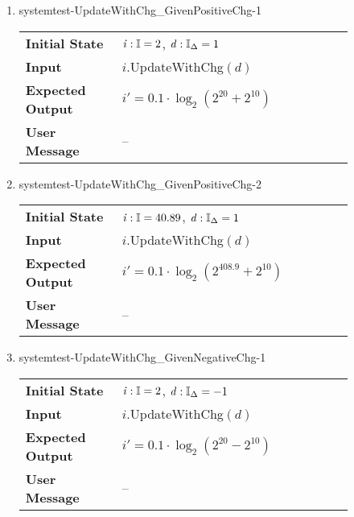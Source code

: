 \begin{enumerate}

    \item{systemtest-UpdateWithChg\_GivenPositiveChg-1}
    \begin{table}[H]
        \centering
        \begin{tabular}{P{0.25\linewidth}P{0.6\linewidth}}
            \toprule
            \textbf{Initial State} & $ \mathit{i} : \mathbb{I} = 2
            $, $ \mathit{d} : \mathbb{I}_{\Delta} = 1 $ \\
            \textbf{Input} & $\mathit{i}.
            $UpdateWithChg$(\mathit{d}) $ \\ \midrule
            \textbf{Expected Output} & $ \mathit{i}' = 0.1 \cdot \log_2(2^{20}
            + 2^{10}) $ \\
            \textbf{User Message} & -- \\ \bottomrule
        \end{tabular}
    \end{table}

    \item{systemtest-UpdateWithChg\_GivenPositiveChg-2}
    \begin{table}[H]
        \centering
        \begin{tabular}{P{0.25\linewidth}P{0.6\linewidth}}
            \toprule
            \textbf{Initial State} & $ \mathit{i} : \mathbb{I} =
            40.89 $, $ \mathit{d} : \mathbb{I}_{\Delta} = 1 $ \\
            \textbf{Input} & $\mathit{i}.
            $UpdateWithChg$(\mathit{d}) $ \\ \midrule
            \textbf{Expected Output} & $ \mathit{i}' = 0.1 \cdot
            \log_2(2^{408.9} + 2^{10}) $ \\
            \textbf{User Message} & -- \\ \bottomrule
        \end{tabular}
    \end{table}

    \item{systemtest-UpdateWithChg\_GivenNegativeChg-1}
    \begin{table}[H]
        \centering
        \begin{tabular}{P{0.25\linewidth}P{0.6\linewidth}}
            \toprule
            \textbf{Initial State} & $ \mathit{i} : \mathbb{I} = 2
            $, $ \mathit{d} : \mathbb{I}_{\Delta} = -1 $ \\
            \textbf{Input} & $\mathit{i}.
            $UpdateWithChg$(\mathit{d}) $ \\ \midrule
            \textbf{Expected Output} & $ \mathit{i}' = 0.1 \cdot \log_2(2^{20}
            - 2^{10}) $ \\
            \textbf{User Message} & -- \\ \bottomrule
        \end{tabular}
    \end{table}


\end{enumerate}
